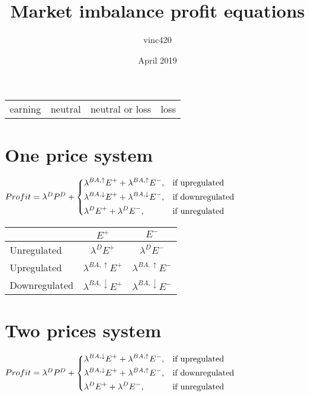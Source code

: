 \documentclass{article}
\title{Market imbalance profit equations}
\author{vinc420 }
\date{April 2019}
\begin{document}
\maketitle

\begin{tabular}{ |C|C|C|C|  }
\hline
{}earning &
neutral &
neutral or loss &
loss

\end{tabular}

\section*{One price system}

\begin{math}
    Profit = \lambda^{D}P^{D} +
    \begin{dcases}
    \lambda^{BA,\uparrow}E^{+}+\lambda^{BA,\uparrow}E^{-}, & \mbox{if upregulated} \\ \lambda^{BA,\downarrow}E^{+}+\lambda^{BA,\downarrow}E^{-}, & \mbox{if downregulated} \\ \lambda^{D}E^{+}+\lambda^{D}E^{-}, & \mbox{if unregulated}
    \end{dcases}
\end{math}
\\
\newline

\begin{tabular}{ |s|c|c|  }
\hline
{} & $E^{+}$ &  $E^{-}$ \\
\hline
{} Unregulated & $\lambda^{D}E^{+}$ & $\lambda^{D}E^{-}$ \\
 Upregulated & $\lambda^{BA,\uparrow}E^{+}$ & $\lambda^{BA,\uparrow}E^{-}$ \\
 Downregulated & $\lambda^{BA,\downarrow}E^{+}$ & $\lambda^{BA,\downarrow}E^{-}$ \\
\hline
\end{tabular}

\section*{Two prices system}
\begin{math}
    Profit = \lambda^{D}P^{D} +
    \begin{dcases}
    \lambda^{BA,\downarrow}E^{+}+\lambda^{BA,\uparrow}E^{-}, & \mbox{if upregulated} \\ \lambda^{BA,\downarrow}E^{+}+\lambda^{BA,\uparrow}E^{-}, & \mbox{if downregulated} \\ \lambda^{D}E^{+}+\lambda^{D}E^{-}, & \mbox{if unregulated}
    \end{dcases}
\end{math}
\\
\newline
\end{document}
